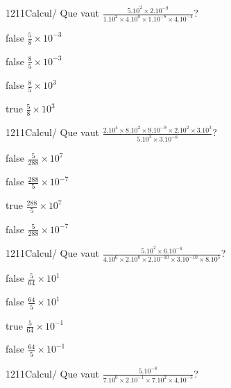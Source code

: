             \begin{question}{1211}{Calcul}{}{/}
                Que vaut $\frac{5.10^{2}\times 2.10^{-9}}{1.10^{2}\times 4.10^{0}\times 1.10^{-8}\times 4.10^{-4}}$?
            \end{question}
            \begin{reponses}
                \item[false] $\frac{5}{8}\times 10^{-3}$
                \item[false] $\frac{8}{5}\times 10^{-3}$
                \item[false] $\frac{8}{5}\times 10^{3}$
                \item[true] $\frac{5}{8}\times 10^{3}$
            \end{reponses}
            \begin{question}{1211}{Calcul}{}{/}
                Que vaut $\frac{2.10^{4}\times 8.10^{2}\times 9.10^{-9}\times 2.10^{2}\times 3.10^{3}}{5.10^{3}\times 3.10^{-8}}$?
            \end{question}
            \begin{reponses}
                \item[false] $\frac{5}{288}\times 10^{7}$
                \item[false] $\frac{288}{5}\times 10^{-7}$
                \item[true] $\frac{288}{5}\times 10^{7}$
                \item[false] $\frac{5}{288}\times 10^{-7}$
            \end{reponses}
            \begin{question}{1211}{Calcul}{}{/}
                Que vaut $\frac{5.10^{2}\times 6.10^{-4}}{4.10^{6}\times 2.10^{8}\times 2.10^{-10}\times 3.10^{-10}\times 8.10^{5}}$?
            \end{question}
            \begin{reponses}
                \item[false] $\frac{5}{64}\times 10^{1}$
                \item[false] $\frac{64}{5}\times 10^{1}$
                \item[true] $\frac{5}{64}\times 10^{-1}$
                \item[false] $\frac{64}{5}\times 10^{-1}$
            \end{reponses}
            \begin{question}{1211}{Calcul}{}{/}
                Que vaut $\frac{5.10^{-8}}{7.10^{0}\times 2.10^{-1}\times 7.10^{2}\times 4.10^{-5}}$?
            \end{question}
